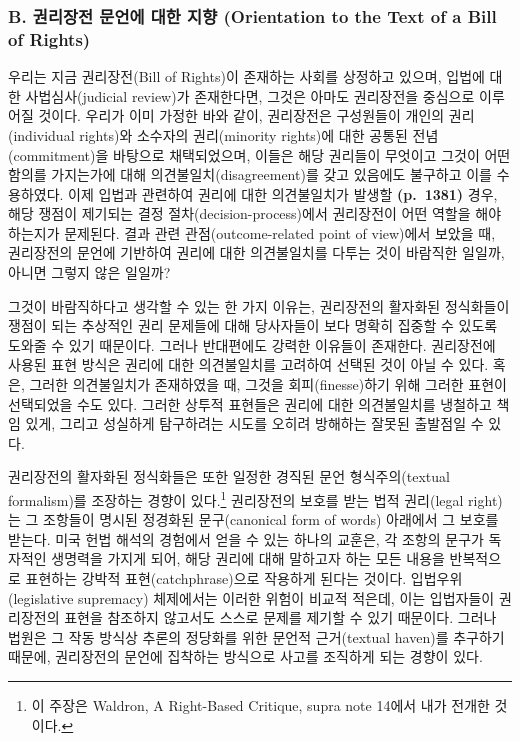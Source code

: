 \documentclass[a4paper,12pt,oneside]{article}  %
\begin{document}
\subsubsection{B. 권리장전 문언에 대한 지향 (Orientation to the Text of
a Bill of
Rights)}\label{b.-uxad8cuxb9acuxc7a5uxc804-uxbb38uxc5b8uxc5d0-uxb300uxd55c-uxc9c0uxd5a5-orientation-to-the-text-of-a-bill-of-rights}

우리는 지금 권리장전(Bill of Rights)이 존재하는 사회를 상정하고 있으며,
입법에 대한 사법심사(judicial review)가 존재한다면, 그것은 아마도
권리장전을 중심으로 이루어질 것이다. 우리가 이미 가정한 바와 같이,
권리장전은 구성원들이 개인의 권리(individual rights)와 소수자의
권리(minority rights)에 대한 공통된 전념(commitment)을 바탕으로
채택되었으며, 이들은 해당 권리들이 무엇이고 그것이 어떤 함의를
가지는가에 대해 의견불일치(disagreement)를 갖고 있음에도 불구하고 이를
수용하였다. 이제 입법과 관련하여 권리에 대한 의견불일치가 발생할
\textbf{(p.~1381)} 경우, 해당 쟁점이 제기되는 결정
절차(decision-process)에서 권리장전이 어떤 역할을 해야 하는지가
문제된다. 결과 관련 관점(outcome-related point of view)에서 보았을 때,
권리장전의 문언에 기반하여 권리에 대한 의견불일치를 다투는 것이 바람직한
일일까, 아니면 그렇지 않은 일일까?

그것이 바람직하다고 생각할 수 있는 한 가지 이유는, 권리장전의 활자화된
정식화들이 쟁점이 되는 추상적인 권리 문제들에 대해 당사자들이 보다
명확히 집중할 수 있도록 도와줄 수 있기 때문이다. 그러나 반대편에도
강력한 이유들이 존재한다. 권리장전에 사용된 표현 방식은 권리에 대한
의견불일치를 고려하여 선택된 것이 아닐 수 있다. 혹은, 그러한
의견불일치가 존재하였을 때, 그것을 회피(finesse)하기 위해 그러한 표현이
선택되었을 수도 있다. 그러한 상투적 표현들은 권리에 대한 의견불일치를
냉철하고 책임 있게, 그리고 성실하게 탐구하려는 시도를 오히려 방해하는
잘못된 출발점일 수 있다.

권리장전의 활자화된 정식화들은 또한 일정한 경직된 문언 형식주의(textual
formalism)를 조장하는 경향이 있다.\footnote{이 주장은 Waldron, A
  Right-Based Critique, supra note 14에서 내가 전개한 것이다.}
권리장전의 보호를 받는 법적 권리(legal right)는 그 조항들이 명시된
정경화된 문구(canonical form of words) 아래에서 그 보호를 받는다. 미국
헌법 해석의 경험에서 얻을 수 있는 하나의 교훈은, 각 조항의 문구가
독자적인 생명력을 가지게 되어, 해당 권리에 대해 말하고자 하는 모든
내용을 반복적으로 표현하는 강박적 표현(catchphrase)으로 작용하게 된다는
것이다. 입법우위(legislative supremacy) 체제에서는 이러한 위험이 비교적
적은데, 이는 입법자들이 권리장전의 표현을 참조하지 않고서도 스스로
문제를 제기할 수 있기 때문이다. 그러나 법원은 그 작동 방식상 추론의
정당화를 위한 문언적 근거(textual haven)를 추구하기 때문에, 권리장전의
문언에 집착하는 방식으로 사고를 조직하게 되는 경향이 있다.
\end{document}
